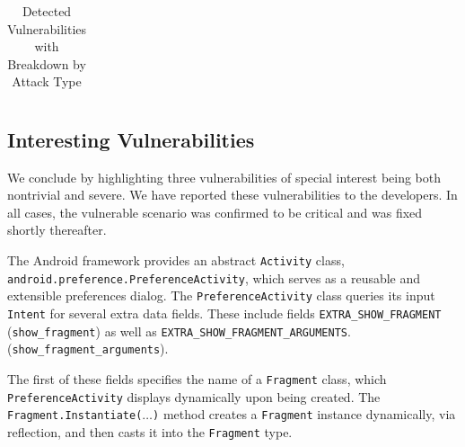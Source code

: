 \begin{table}
\begin{scriptsize}
\begin{center}
\begin{tabular}{l|c|c|c|c|c|c|c|c|c|c}
\end{tabular}
\end{center}
\end{scriptsize}
\caption{\label{Ta:vulns}Detected Vulnerabilities with Breakdown by Attack Type}
\end{table}

\subsection{Interesting Vulnerabilities}\label{Se:caseStudies}

We conclude by highlighting three vulnerabilities of special interest being both nontrivial and severe. We have reported these vulnerabilities to the developers. In all cases, the vulnerable scenario was confirmed to be critical and was fixed shortly thereafter.

\label{Se:PreferenceActivities}

The Android framework provides an abstract {\tt Activity} class,\texttt{
android.preference.PreferenceActivity}, which serves as a reusable and extensible preferences dialog. 
The {\tt PreferenceActivity} class queries its input {\tt Intent} for several extra data fields. These include fields \texttt{EXTRA\_SHOW\_FRAGMENT}
(\texttt{show\_fragment}) 
as well as \texttt{EXTRA\_SHOW\_FRAGMENT\_ARGUMENTS}.
(\texttt{show\_fragment\_arguments}).

The first of these fields specifies the name 
of a \texttt{Fragment} class, which \texttt{PreferenceActivity}
displays dynamically upon being created. The {\tt Fragment.Instantiate($\ldots$)} method creates a {\tt Fragment} instance dynamically, via reflection, and then
casts it into the {\tt Fragment} type.

